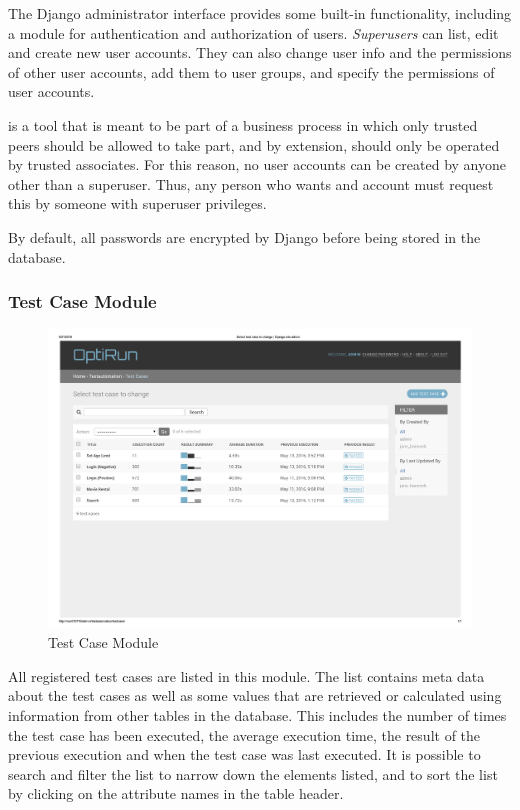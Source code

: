 \noindent The Django administrator interface provides some built-in functionality, including a module for authentication and authorization of users. \emph{Superusers} can list, edit and create new user accounts. They can also change user info and the permissions of other user accounts, add them to user groups, and specify the permissions of user accounts.

\toolname \space is a tool that is meant to be part of a business process in which only trusted peers should be allowed to take part, and by extension, \toolname \space should only be operated by trusted associates. For this reason, no user accounts can be created by anyone other than a superuser. Thus, any person who wants and account must request this by someone with superuser privileges. 

By default, all passwords are encrypted by Django before being stored in the database.






\subsubsection{Test Case Module}\label{subsubsection.test_case_module}

\begin{figure}[h]
    \centering
    \includegraphics[width=\textwidth]{figures/test_cases.pdf}
    \caption{Test Case Module}
    \label{fig.tc_mod}
\end{figure}

All registered test cases are listed in this module. The list contains meta data about the test cases as well as some values that are retrieved or calculated using information from other tables in the database. This includes the number of times the test case has been executed, the average execution time, the result of the previous execution and when the test case was last executed. It is possible to search and filter the list to narrow down the elements listed, and to sort the list by clicking on the attribute names in the table header.

